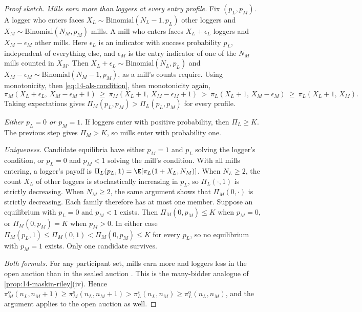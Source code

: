 \begin{proof}[Proof sketch]
\emph{Mills earn more than loggers at every entry profile.} Fix $(p_L,p_M)$. A logger who enters
faces $X_L\sim\text{Binomial}(N_L-1,p_L)$ other loggers and $X_M\sim\text{Binomial}(N_M,p_M)$ mills. A
mill who enters faces $X_L+\epsilon_L$ loggers and $X_M-\epsilon_M$ other mills. Here $\epsilon_L$ is an
indicator with success probability $p_L$, independent of everything else, and $\epsilon_M$ is the entry
indicator of one of the $N_M$ mills counted in $X_M$. Then $X_L+\epsilon_L\sim\text{Binomial}(N_L,p_L)$
and $X_M-\epsilon_M\sim\text{Binomial}(N_M-1,p_M)$, as a mill's counts require. Using monotonicity, then \eqref{eq:14-als-condition}, then monotonicity again,
\[
\pi_M(X_L+\epsilon_L,\,X_M-\epsilon_M+1)\ \ge\ \pi_M(X_L+1,\,X_M-\epsilon_M+1)\ >\
\pi_L(X_L+1,\,X_M-\epsilon_M)\ \ge\ \pi_L(X_L+1,\,X_M).
\]
Taking expectations gives $\Pi_M(p_L,p_M)>\Pi_L(p_L,p_M)$ for every profile.

\emph{Either $p_L=0$ or $p_M=1$.} If loggers enter with positive probability, then $\Pi_L\ge K$. The
previous step gives $\Pi_M>K$, so mills enter with probability one.

\emph{Uniqueness.} Candidate equilibria have either $p_M=1$ and $p_L$ solving the logger's condition,
or $p_L=0$ and $p_M<1$ solving the mill's condition. With all mills entering, a logger's payoff is
$\Pi_L(p_L,1)=\E[\pi_L(1+X_L,N_M)]$. When $N_L\ge 2$, the count $X_L$ of other loggers is
stochastically increasing in $p_L$, so $\Pi_L(\cdot,1)$ is strictly decreasing. When $N_M\ge 2$, the
same argument shows that $\Pi_M(0,\cdot)$ is strictly decreasing. Each family therefore has at most
one member. Suppose an equilibrium with $p_L=0$
and $p_M<1$ exists. Then $\Pi_M(0,p_M)\le K$ when $p_M=0$, or $\Pi_M(0,p_M)=K$ when $p_M>0$. In
either case $\Pi_M(p_L,1)\le\Pi_M(0,1)<\Pi_M(0,p_M)\le K$ for every $p_L$, so no equilibrium with
$p_M=1$ exists. Only one candidate survives.

\emph{Both formats.} For any participant set, mills earn more and loggers less in the open auction
than in the sealed auction \citep[Section II.D]{AtheyLevinSeira2011}. This is the many-bidder
analogue of \cref{prop:14-maskin-riley}(iv). Hence
$\pi_M^{\mathrm{o}}(n_L,n_M+1)\ge\pi_M^{\mathrm{s}}(n_L,n_M+1)>\pi_L^{\mathrm{s}}(n_L,n_M)\ge\pi_L^{\mathrm{o}}(n_L,n_M)$,
and the argument applies to the open auction as well.
\end{proof}

